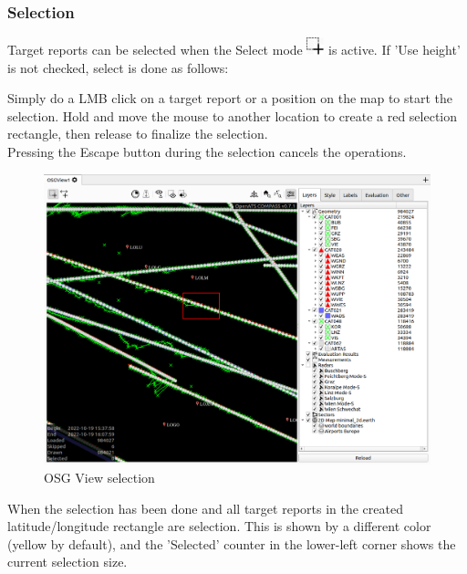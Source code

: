\subsubsection{Selection}
\label{sec:osgview_selection}

Target reports can be selected when the Select mode \includegraphics[width=0.5cm,frame]{../../data/icons/select_action.png} is active. If 'Use height' is not checked, select is done as follows:

Simply do a LMB click on a target report or a position on the map to start the selection. Hold and move the mouse to another location to create a red selection rectangle, then release to finalize the selection. \\

Pressing the Escape button during the selection cancels the operations.

\begin{figure}[H]
    \hspace*{-2.5cm}
    \includegraphics[width=19cm,frame]{figures/osgview_select1.png}
  \caption{OSG View selection}
\end{figure}

When the selection has been done and all target reports in the created latitude/longitude rectangle are selection. This is shown by a different color (yellow by default), and the 'Selected' counter in the lower-left corner shows the current selection size.

